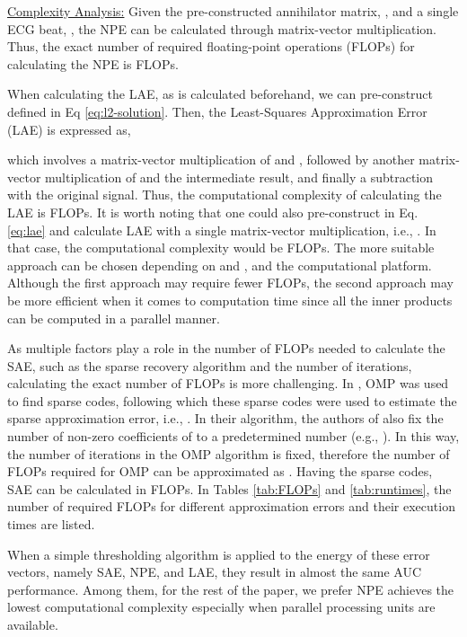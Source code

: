 \documentclass[journal,transmag]{IEEEtran}
\begin{document}
\underline{Complexity Analysis:} Given the pre-constructed annihilator matrix, , and a single ECG beat, , the NPE can be calculated through matrix-vector multiplication. Thus, the exact number of required floating-point operations (FLOPs) for calculating the NPE is  FLOPs.

When calculating the LAE, as  is calculated beforehand, we can pre-construct  defined in Eq \ref{eq:l2-solution}. Then, the Least-Squares Approximation Error (LAE) is expressed as,

which involves a matrix-vector multiplication of  and , followed by another matrix-vector multiplication of  and the intermediate result, and finally a subtraction with the original signal. Thus, the computational complexity of calculating the LAE is  FLOPs. It is worth noting that one could also pre-construct  in Eq. \eqref{eq:lae} and calculate LAE with a single matrix-vector multiplication, i.e., . In that case, the computational complexity would be  FLOPs. The more suitable approach can be chosen depending on  and , and the computational platform. Although the first approach may require fewer FLOPs, the second approach may be more efficient when it comes to computation time since all the inner products can be computed in a parallel manner.

As multiple factors play a role in the number of FLOPs needed to calculate the SAE, such as the sparse recovery algorithm and the number of iterations, calculating the exact number of FLOPs is more challenging. In \cite{carrera2016ecg}, OMP was used to find sparse codes, following which these sparse codes were used to estimate the sparse approximation error, i.e., . In their algorithm, the authors of \cite{carrera2016ecg} also fix the number of non-zero coefficients of  to a predetermined number (e.g., ). In this way, the number of iterations in the OMP algorithm is fixed, therefore the number of FLOPs required for OMP can be approximated as . Having the sparse codes, SAE can be calculated in  FLOPs. In Tables \ref{tab:FLOPs} and \ref{tab:runtimes}, the number of required FLOPs for different approximation errors and their execution times are listed.

When a simple thresholding algorithm is applied to the energy of these error vectors, namely SAE, NPE, and LAE, they result in almost the same AUC performance.
Among them, for the rest of the paper, we prefer NPE achieves the lowest computational complexity especially when parallel processing units are available. 
\end{document}

